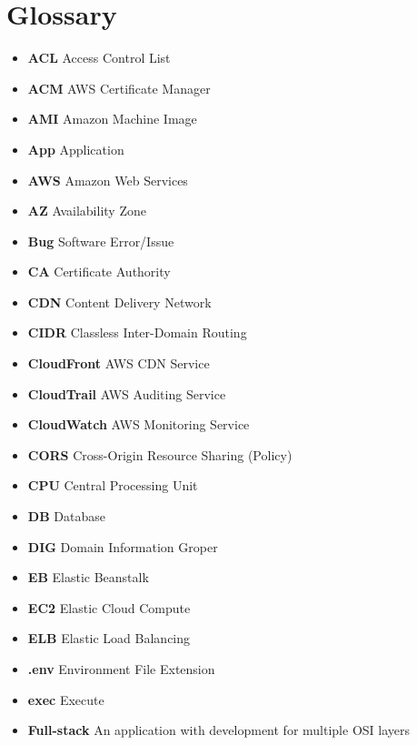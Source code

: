 \beforeabstract
\afterabstract
\chapter{Glossary}\label{ch:glossary}

\begin{itemize}
    \item  \textbf{ACL} \textemdash Access Control List
    \item  \textbf{ACM} \textemdash AWS Certificate Manager
    \item  \textbf{AMI} \textemdash Amazon Machine Image
    \item  \textbf{App} \textemdash Application
    \item  \textbf{AWS} \textemdash Amazon Web Services
    \item  \textbf{AZ} \textemdash Availability Zone
    \item  \textbf{Bug} \textemdash Software Error/Issue
    \item  \textbf{CA} \textemdash Certificate Authority
    \item  \textbf{CDN} \textemdash Content Delivery Network
    \item  \textbf{CIDR} \textemdash Classless Inter-Domain Routing
    \item  \textbf{CloudFront} \textemdash AWS CDN Service
    \item  \textbf{CloudTrail} \textemdash AWS Auditing Service
    \item  \textbf{CloudWatch} \textemdash AWS Monitoring Service
    \item  \textbf{CORS} \textemdash Cross-Origin Resource Sharing (Policy)
    \item  \textbf{CPU} \textemdash Central Processing Unit
    \item  \textbf{DB} \textemdash Database
    \item  \textbf{DIG} \textemdash Domain Information Groper
    \item  \textbf{EB} \textemdash Elastic Beanstalk
    \item  \textbf{EC2} \textemdash Elastic Cloud Compute
    \item  \textbf{ELB} \textemdash Elastic Load Balancing
    \item  \textbf{.env} \textemdash Environment File Extension
    \item  \textbf{exec} \textemdash Execute
    \item  \textbf{Full-stack} \textemdash An application with development for multiple OSI layers

\end{itemize}
